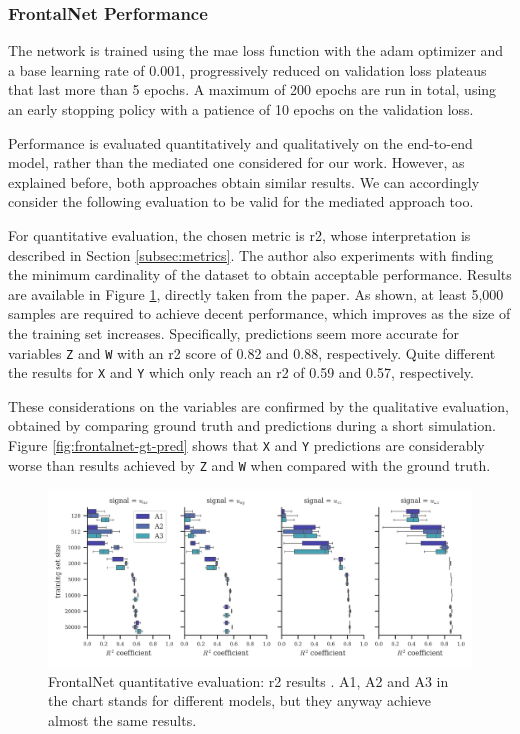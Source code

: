 \subsubsection{FrontalNet Performance}
\label{subsec:frontalnet-performance}


The network is trained using the \gls{mae} loss function with the \gls{adam} optimizer \cite{kingma2014adam} and a base learning rate of 0.001, progressively reduced on validation loss plateaus that last more than 5 epochs. A maximum of 200 epochs are run in total, using an early stopping policy with a patience of 10 epochs on the validation loss. 

Performance is evaluated quantitatively and qualitatively on the end-to-end model, rather than the mediated one considered for our work. However, as explained before, both approaches obtain similar results. We can accordingly consider the following evaluation to be valid for the mediated approach too.

For quantitative evaluation, the chosen metric is \gls{r2}, whose interpretation is described in Section \ref{subsec:metrics}. The author also experiments with finding the minimum cardinality of the dataset to obtain acceptable performance. Results are available in Figure \ref{fig:frontalnet-r2}, directly taken from the paper. As shown, at least 5,000 samples are required to achieve decent performance, which improves as the size of the training set increases. Specifically, predictions seem more accurate for variables \texttt{Z} and \texttt{W} with an \gls{r2} score of 0.82 and 0.88, respectively. Quite different the results for \texttt{X} and \texttt{Y} which only reach an \gls{r2} of 0.59 and 0.57, respectively.

These considerations on the variables are confirmed by the qualitative evaluation, obtained by comparing ground truth and predictions during a short simulation. Figure \ref{fig:frontalnet-gt-pred} shows that \texttt{X} and \texttt{Y} predictions are considerably worse than results achieved by \texttt{Z} and \texttt{W} when compared with the ground truth.

\begin{figure}[!htb]
	\centering
	\includegraphics[width=1\textwidth]{"contents/images/03-frontalnet-r2"}
	\caption[FrontalNet quantitative evaluation: \gls{r2} results \cite{mantegazza2019visionbased}]{FrontalNet quantitative evaluation: \gls{r2} results \cite{mantegazza2019visionbased}. A1, A2 and A3 in the chart stands for different models, but they anyway achieve almost the same results.}
	\label{fig:frontalnet-r2}
\end{figure}

